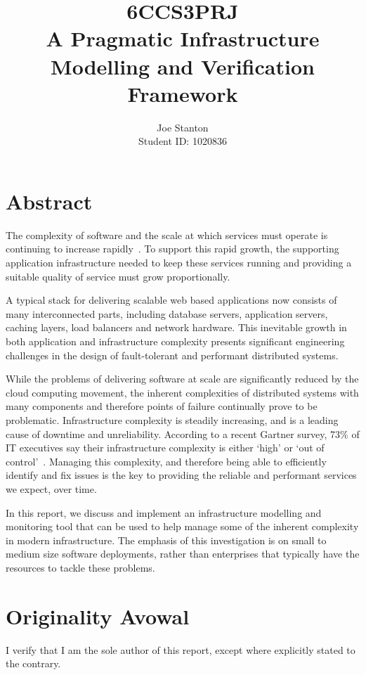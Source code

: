 \documentclass{cshonours}
\title{6CCS3PRJ \\\vspace{0.5cm}
  A Pragmatic Infrastructure Modelling and Verification Framework}
\author{Joe Stanton\\\vspace{0.5cm}
  Student ID: 1020836
}
\begin{document}
\maketitle

\chapter*{Abstract}
The complexity of software and the scale at which services must operate is continuing to increase rapidly~\cite{SoftwareComplexity}.
To support this rapid growth, the supporting application infrastructure needed to keep these services running and providing a suitable quality of service must grow proportionally.

A typical stack for delivering scalable web based applications now consists of many interconnected parts, including database servers, application servers, caching layers, load balancers and network hardware.
This inevitable growth in both application and infrastructure complexity presents significant engineering challenges in the design of fault-tolerant and performant distributed systems.

While the problems of delivering software at scale are significantly reduced by the cloud computing movement, the inherent complexities of distributed systems with many components and therefore points of failure continually prove to be problematic. Infrastructure complexity is steadily increasing, and is a leading cause of downtime and unreliability. According to a recent Gartner survey, 73\% of IT executives say their infrastructure complexity is either `high' or `out of control'~\cite{Gartner2013}. Managing this complexity, and therefore being able to efficiently identify and fix issues is the key to providing the reliable and performant services we expect, over time.

In this report, we discuss and implement an infrastructure modelling and monitoring tool that can be used to help manage some of the inherent complexity in modern infrastructure. The emphasis of this investigation is on small to medium size software deployments, rather than enterprises that typically have the resources to tackle these problems.

\chapter*{Originality Avowal}
I verify that I am the sole author of this report, except where explicitly stated to the contrary. 
\end{document}
